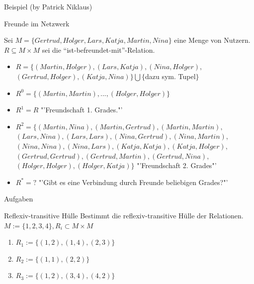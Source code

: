 \begin{frame}{Beispiel (by Patrick Niklaus)}
	\begin{exampleblock}{Freunde im Netzwerk}
    {\small
			Sei $M = \{ Gertrud, Holger, Lars, Katja, Martin, Nina \}$ eine Menge von Nutzern.\\
			$R \subseteq M \times M $ sei die "`ist-befreundet-mit"'-Relation.
		\begin{itemize}
			\item $R = \{ (Martin,Holger), (Lars,Katja), (Nina,Holger),$ \\
						$(Gertrud,Holger), (Katja, Nina) \} \bigcup \{${dazu sym. Tupel}$\}$ \pause
			\item $R^0=\{ (Martin,Martin), ..., (Holger,Holger) \}$ \pause
			\item $R^1=R$ "'Freundschaft 1. Grades."' \pause
			\item $R^2=\{ (Martin,Nina), (Martin,Gertrud), (Martin,Martin),$ \\
						$(Lars,Nina), (Lars,Lars), (Nina,Gertrud),(Nina,Martin),$ \\
						$(Nina,Nina), (Nina,Lars), (Katja,Katja), (Katja,Holger), $ \\
						$(Gertrud,Gertrud), (Gertrud,Martin), (Gertrud,Nina), $ \\
						$(Holger,Holger), (Holger,Katja)\}$ "'Freundschaft 2. Grades"' \pause
			\item $R^*=?$ "'Gibt es eine Verbindung durch Freunde beliebigen Grades?"'
		\end{itemize}
    }
	\end{exampleblock}
\end{frame}

\begin{frame}{Aufgaben}
  \begin{exampleblock}{Reflexiv-transitive Hülle}
    Bestimmt die reflexiv-transitive Hülle der Relationen.\\
    $M := \{1, 2, 3, 4\}, R_i \subset M \times M$
    \begin{enumerate}
      \item $R_1 := \{(1, 2), (1, 4), (2, 3)\}$
      \item $R_2 := \{(1, 1), (2, 2)\}$
      \item $R_3 := \{(1, 2), (3, 4), (4, 2)\}$
    \end{enumerate}
  \end{exampleblock}\pause
\end{frame}

